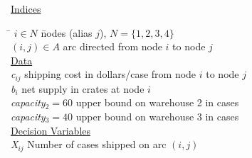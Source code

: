 \noindent\underline{Indices}
\begin{tabbing}
\hspace{.5cm} \= $i\in N$ \hspace{2.5cm} \= nodes (alias $j$), $N=\{1,2,3,4\}$ \\
\> $(i,j)\in A$ \>  arc directed from node $i$ to node $j$ \\

\noindent\underline{Data}\\%
\> {\it c}$_{ij}$ \> shipping cost in dollars/case from node $i$ to node $j$ \\
\> {\it b}$_{i}$ \> net supply in crates at node $i$ \\
\> {\it capacity}$_2 = 60$ \> upper bound on warehouse 2 in cases \\
\> {\it capacity}$_3 = 40$ \> upper bound on warehouse 3 in cases \\

\noindent\underline{Decision Variables}\\%
\> {\it X}$_{ij}$ \> Number of cases shipped on arc $(i,j)$  \\
\end{tabbing}

